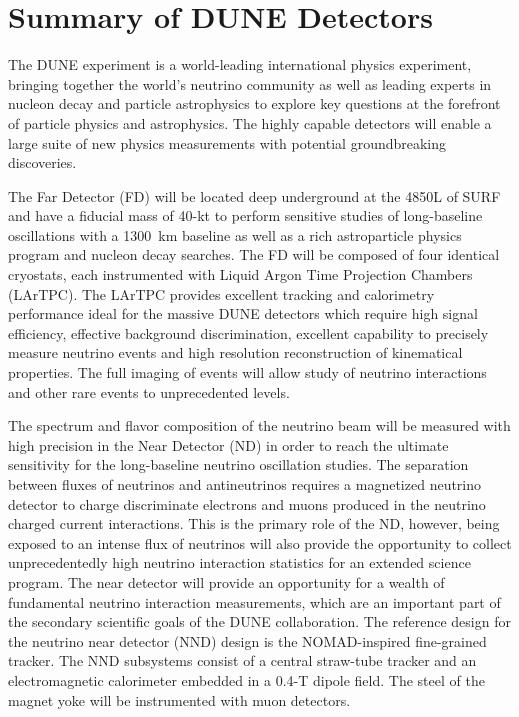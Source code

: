 \chapter{Summary of DUNE Detectors}
\label{ch:physics-summary}

The DUNE experiment is a world-leading international physics
experiment, bringing together the world's neutrino community as well
as leading experts in nucleon decay and particle astrophysics to
explore key questions at the forefront of particle physics and
astrophysics. The highly capable detectors will enable a
large suite of new physics measurements with potential groundbreaking
discoveries.

The Far Detector (FD) will be located deep underground at the 4850L of
SURF and have a fiducial mass of 40-kt to perform sensitive studies of
long-baseline oscillations with a 1300~km baseline as well as a rich
astroparticle physics program and nucleon decay searches. The FD
will be composed of four identical cryostats, each instrumented with
Liquid Argon Time Projection Chambers (LArTPC). The LArTPC provides
excellent tracking and calorimetry performance ideal for the massive
DUNE detectors which require high signal efficiency, effective
background discrimination, excellent capability to precisely measure
neutrino events and high resolution reconstruction of kinematical
properties. The full imaging of events will allow study of neutrino
interactions and other rare events to unprecedented levels.

The spectrum and flavor composition of the neutrino beam will be
measured with high precision in the Near Detector (ND) in order to
reach the ultimate sensitivity for the long-baseline neutrino
oscillation studies.  The separation between fluxes of neutrinos and
antineutrinos requires a magnetized neutrino detector to charge
discriminate electrons and muons produced in the neutrino charged
current interactions.  This is the primary role of the ND, however,
being exposed to an intense flux of neutrinos will also provide the
opportunity to collect unprecedentedly high neutrino
interaction statistics for an extended science program.  The near detector will
provide an opportunity for a wealth of fundamental neutrino
interaction measurements, which are an important part of the secondary
scientific goals of the DUNE collaboration.  The reference design for
the neutrino near detector (NND) design is the NOMAD-inspired
fine-grained tracker. The NND subsystems consist of a central
straw-tube tracker and an electromagnetic calorimeter embedded in a
0.4-T dipole field. The steel of the magnet yoke will be instrumented
with muon detectors.
